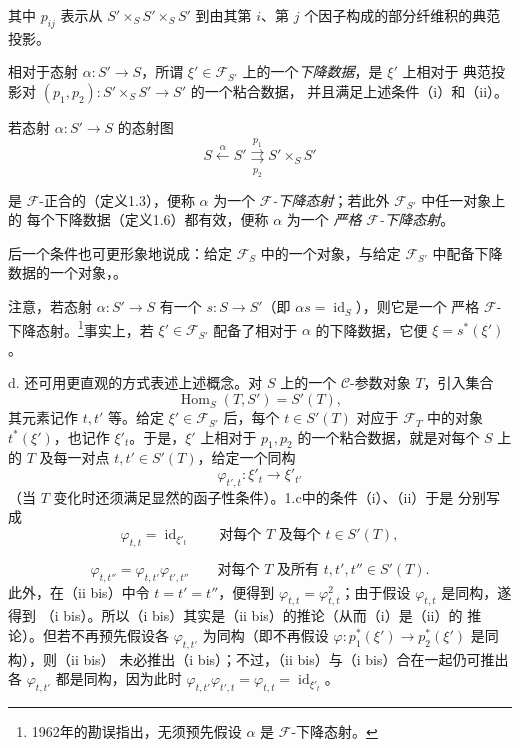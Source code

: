 其中 $p_{ij}$ 表示从 $S'\times_S S'\times_S S'$ 到由其第 $i$、第 $j$
个因子构成的部分纤维积的典范投影。

 相对于态射 $\alpha:S'\longrightarrow S$，所谓
$\xi'\in\mathcal F_{S'}$ 上的一个\emph{下降数据}，是 $\xi'$ 上相对于
典范投影对 $(p_1,p_2):S'\times_S S'\longrightarrow S'$ 的一个粘合数据，
并且满足上述条件（i）和（ii）。

 若态射 $\alpha:S'\longrightarrow S$ 的态射图
\[
  S\xleftarrow{\alpha}S'
  \overset{p_1}{\underset{p_2}{\rightrightarrows}}S'\times_S S'
\]

是 $\mathcal F$-正合的（定义1.3），便称 $\alpha$ 为一个
\emph{$\mathcal F$-下降态射}；若此外 $\mathcal F_{S'}$ 中任一对象上的
每个下降数据（定义1.6）都有效，便称 $\alpha$ 为一个
\emph{严格 $\mathcal F$-下降态射}。

后一个条件也可更形象地说成：给定 $\mathcal F_S$ 中的一个对象，与给定
$\mathcal F_{S'}$ 中配备下降数据的一个对象，。

注意，若态射 $\alpha:S'\longrightarrow S$ 有一个
$s:S\longrightarrow S'$（即 $\alpha s=\operatorname{id}_S$），则它是一个
严格 $\mathcal F$-下降态射。\footnote{1962年的勘误指出，无须预先假设
$\alpha$ 是 $\mathcal F$-下降态射。}事实上，若
$\xi'\in\mathcal F_{S'}$ 配备了相对于 $\alpha$ 的下降数据，它便
$\xi=s^*(\xi')$。

\medskip\noindent
d. 还可用更直观的方式表述上述概念。对 $S$ 上的一个 $\mathcal C$-参数对象
$T$，引入集合
\[
  \operatorname{Hom}_S(T,S')=S'(T),
\]
其元素记作 $t,t'$ 等。给定 $\xi'\in\mathcal F_{S'}$ 后，每个
$t\in S'(T)$ 对应于 $\mathcal F_T$ 中的对象 $t^*(\xi')$，也记作
$\xi'_t$。于是，$\xi'$ 上相对于 $p_1,p_2$ 的一个粘合数据，就是对每个
$S$ 上的 $T$ 及每一对点 $t,t'\in S'(T)$，给定一个同构
\[
  \varphi_{t',t}:\xi'_t\longrightarrow\xi'_{t'}
\]
（当 $T$ 变化时还须满足显然的函子性条件）。1.c中的条件（i）、（ii）于是
分别写成
\[
  \tag{i bis}
  \varphi_{t,t}=\operatorname{id}_{\xi'_t}
  \qquad\text{对每个 $T$ 及每个 $t\in S'(T)$},
\]

\[
  \tag{ii bis}
  \varphi_{t,t''}=\varphi_{t,t'}\varphi_{t',t''}
  \qquad\text{对每个 $T$ 及所有 $t,t',t''\in S'(T)$}.
\]
此外，在（ii bis）中令 $t=t'=t''$，便得到
$\varphi_{t,t}=\varphi_{t,t}^2$；由于假设 $\varphi_{t,t}$ 是同构，遂得到
（i bis）。所以（i bis）其实是（ii bis）的推论（从而（i）是（ii）的
推论）。但若不再预先假设各 $\varphi_{t,t'}$ 为同构（即不再假设
$\varphi:p_1^*(\xi')\longrightarrow p_2^*(\xi')$ 是同构），则（ii bis）
未必推出（i bis）；不过，（ii bis）与（i bis）合在一起仍可推出各
$\varphi_{t,t'}$ 都是同构，因为此时
$\varphi_{t,t'}\varphi_{t',t}=\varphi_{t,t}=\operatorname{id}_{\xi'_t}$。

